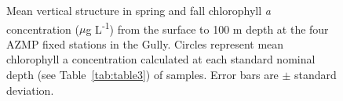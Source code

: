 \documentclass[12pt]{article}\usepackage[]{graphicx}\usepackage[]{color}
\begin{document}
\begin{landscapepage}
\begin{figure}[htb]

{\centering {} 

}

\caption{Mean vertical structure in spring and fall chlorophyll \emph{a} concentration (\(\mu\)g L\textsuperscript{-1}) from the surface to 100 m depth at the four AZMP fixed stations in the Gully. Circles represent mean chlorophyll a concentration calculated at each standard nominal depth (see Table~\ref{tab:table3}) of samples. Error bars are \(\pm\) standard deviation.}\label{fig:figure23}
\end{figure}
\end{landscapepage}
\clearpage
\end{document}
